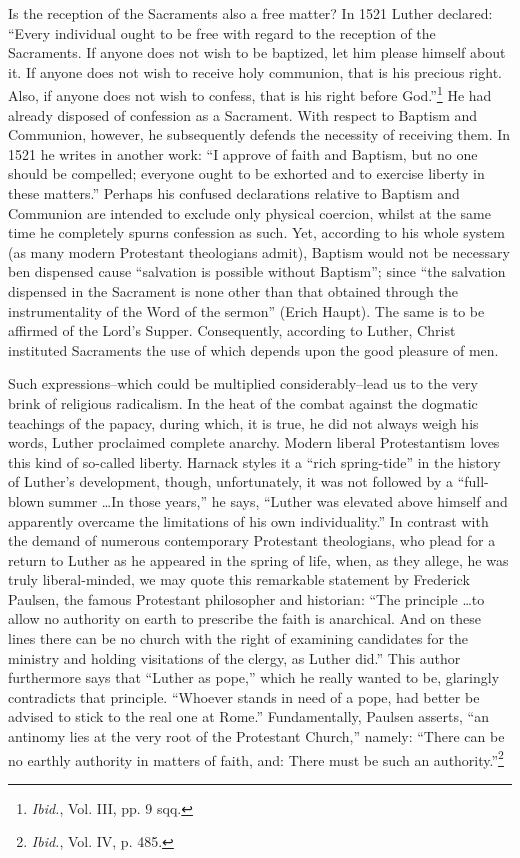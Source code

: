 Is the reception of the Sacraments also a free matter? In 1521 Luther
declared: “Every individual ought to be free with regard to the reception
of the Sacraments. If anyone does not wish to be baptized, let him please
himself about it. If anyone does not wish to receive holy communion, that
is his precious right. Also, if anyone does not wish to confess, that is his
right before God.”\footnote{\textit{Ibid.}, Vol. III, pp. 9 sqq.}
He had already disposed of confession as a Sacrament.
With respect to Baptism and Communion, however, he subsequently defends
the necessity of receiving them. In 1521 he writes in another work: “I
approve of faith and Baptism, but no one should be compelled; everyone
ought to be exhorted and to exercise liberty in these matters.” Perhaps
his confused declarations relative to Baptism and Communion are intended
to exclude only physical coercion, whilst at the same time he completely
spurns confession as such. Yet, according to his whole system (as many
modern Protestant theologians admit), Baptism would not be necessary ben
dispensed cause “salvation is possible without Baptism”; since ``the salvation dispensed
in the Sacrament is none other than that obtained through the instrumentality
of the Word of the sermon'' (Erich Haupt). The same is to be affirmed
of the Lord’s Supper. Consequently, according to Luther, Christ instituted
Sacraments the use of which depends upon the good pleasure of men.

Such expressions--which could be multiplied considerably--lead
us to the very brink of religious radicalism. In the heat of the combat
against the dogmatic teachings of the papacy, during which, it
is true, he did not always weigh his words, Luther proclaimed complete
anarchy. Modern liberal Protestantism loves this kind of so-called
liberty. Harnack styles it a ``rich spring-tide'' in the history
of Luther's development, though, unfortunately, it was not followed
by a ``full-blown summer \dots In those years,'' he says,
“Luther was elevated above himself and apparently overcame the
limitations of his own individuality.” In contrast with the demand
of numerous contemporary Protestant theologians, who plead for
a return to Luther as he appeared in the spring of life, when, as
they allege, he was truly liberal-minded, we may quote this remarkable
statement by Frederick Paulsen, the famous Protestant
philosopher and historian: “The principle \dots to allow no authority
on earth to prescribe the faith is anarchical. And on these lines
there can be no church with the right of examining candidates for
the ministry and holding visitations of the clergy, as Luther did.”
This author furthermore says that “Luther as pope,” which he
really wanted to be, glaringly contradicts that principle. “Whoever
stands in need of a pope, had better be advised to stick to the real
one at Rome.” Fundamentally, Paulsen asserts, “an antinomy lies at
the very root of the Protestant Church,” namely: “There can be
no earthly authority in matters of faith, and: There must be such
an authority.”\footnote{\textit{Ibid.}, Vol. IV, p. 485.}

